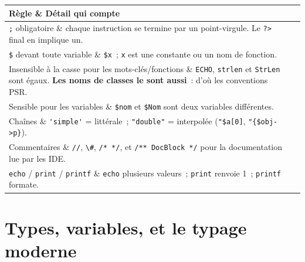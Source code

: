 \documentclass[12pt,a4paper,twoside,openright]{book}
\makeatletter
\newenvironment{tabz}[1]{\rowcolors{2}{white}{tralight}%
  \small\setlength{\tabcolsep}{5pt}\setlength{\LTpre}{3pt}\setlength{\LTpost}{3pt}%
  \begin{longtable}{@{}#1@{}}\toprule}
  {\bottomrule\end{longtable}\normalfont\setlength{\tabcolsep}{6pt}}
\newcommand{\thd}[1]{\textbf{\color{white}#1}}
\newcommand{\headrow}{\rowcolor{theadbg}}
\makeatother
\begin{document}
\begin{tabz}{lX}
  \headrow \thd{R\`egle} \& \thd{D\'etail qui compte} \\
  \midrule
  \verb|;| obligatoire \& chaque instruction se termine par un point-virgule. Le \verb|?>| final en implique un. \\
  \verb|$| devant toute variable \& \verb|$x|~; \verb|x| est une constante ou un nom de fonction. \\
  Insensible \`a la casse pour les mots-cl\'es/fonctions \& \verb|ECHO|, \verb|strlen| et \verb|StrLen| sont \'egaux. \textbf{Les noms de classes le sont aussi}~: d'o\`u les conventions PSR. \\
  Sensible pour les variables \& \verb|$nom| et \verb|$Nom| sont deux variables diff\'erentes. \\
  Cha\^ines \& \verb|'simple'| = litt\'erale~; \verb|"double"| = interpol\'ee (\verb|"$a[0]|, \verb|"{$obj->p}|). \\
  Commentaires \& \verb|//|, \verb|\#|, \verb|/* */|, et \verb|/** DocBlock */| pour la documentation lue par les IDE. \\
  \verb|echo| / \verb|print| / \verb|printf| \& \verb|echo| plusieurs valeurs~; \verb|print| renvoie 1~; \verb|printf| formate. \\
\end{tabz}

\section{Types, variables, et le typage moderne}
\end{document}
